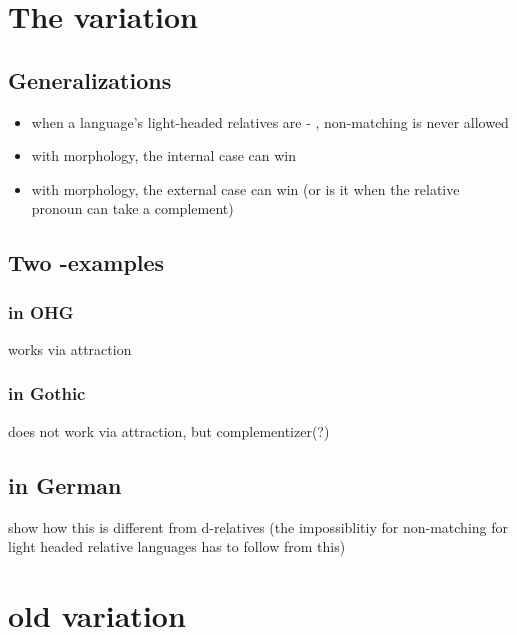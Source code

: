 
\chapter{The variation}

\section{Generalizations}

\begin{itemize}
  \item when a language's light-headed relatives are  - , non-matching is never allowed
  \item with  morphology, the internal case can win
  \item with  morphology, the external case can win (or is it when the relative pronoun can take a complement)
\end{itemize}


\section{Two -examples}

\subsection{ in OHG}

works via attraction

\subsection{ in Gothic}

does not work via attraction, but complementizer(?)

\section{ in German}

show how this is different from d-relatives (the impossiblitiy for non-matching for   light headed relative languages has to follow from this)








\chapter*{old variation}

